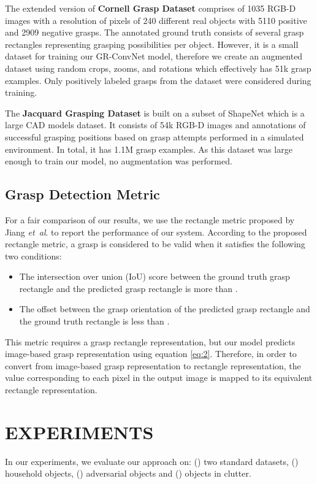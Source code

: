 \documentclass[letterpaper, 10pt, conference]{IEEEtran}
\newcommand{\etal}{\textit{et~al}. }
\begin{document}
The extended version of \textbf{Cornell Grasp Dataset} comprises of 1035 RGB-D images with a resolution of  pixels of 240 different real objects with 5110 positive and 2909 negative grasps. The annotated ground truth consists of several grasp rectangles representing grasping possibilities per object. However, it is a small dataset for training our GR-ConvNet model, therefore we create an augmented dataset using random crops, zooms, and rotations which effectively has 51k grasp examples. Only positively labeled grasps from the dataset were considered during training. 


The \textbf{Jacquard Grasping Dataset} is built on a subset of ShapeNet which is a large CAD models dataset. It consists of 54k RGB-D images and annotations of successful grasping positions based on grasp attempts performed in a simulated environment. In total, it has 1.1M grasp examples. As this dataset was large enough to train our model, no augmentation was performed.


\subsection{Grasp Detection Metric}
For a fair comparison of our results, we use the rectangle metric \cite{jiang2011efficient} proposed by Jiang \etal to report the performance of our system. According to the proposed rectangle metric, a grasp is considered to be valid when it satisfies the following two conditions:
\begin{itemize}
    \item The intersection over union (IoU) score between the ground truth grasp rectangle and the predicted grasp rectangle is more than .
    \item The offset between the grasp orientation of the predicted grasp rectangle and the ground truth rectangle is less than .
\end{itemize}

This metric requires a grasp rectangle representation, but our model predicts image-based grasp representation  using equation \ref{eq:2}. Therefore, in order to convert from image-based grasp representation to rectangle representation, the value corresponding to each pixel in the output image is mapped to its equivalent rectangle representation.



\section{EXPERIMENTS}
In our experiments, we evaluate our approach on: () two standard datasets, () household objects, () adversarial objects and () objects in clutter.
\end{document}
